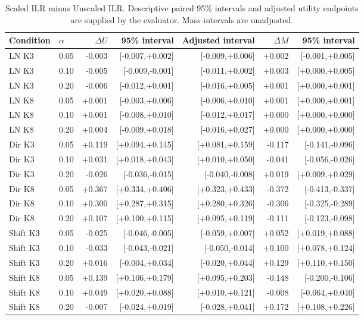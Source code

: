 \begin{table}[p]
\centering\scriptsize
\caption{Scaled ILR minus Unscaled ILR. Descriptive paired 95\% intervals and adjusted utility endpoints are supplied by the evaluator. Mass intervals are unadjusted.}
\begin{tabular}{llrrrrr}
\toprule
Condition & $\alpha$ & $\Delta U$ & 95\% interval & Adjusted interval & $\Delta M$ & 95\% interval \\
\midrule
LN K3 & 0.05 & -0.003 & [-0.007,+0.002] & [-0.009,+0.006] & +0.002 & [-0.001,+0.005] \\
LN K3 & 0.10 & -0.005 & [-0.009,-0.001] & [-0.011,+0.002] & +0.003 & [+0.000,+0.005] \\
LN K3 & 0.20 & -0.006 & [-0.012,+0.001] & [-0.016,+0.005] & +0.001 & [+0.000,+0.001] \\
LN K8 & 0.05 & +0.001 & [-0.003,+0.006] & [-0.006,+0.010] & +0.001 & [+0.000,+0.001] \\
LN K8 & 0.10 & +0.001 & [-0.008,+0.010] & [-0.012,+0.017] & +0.000 & [+0.000,+0.000] \\
LN K8 & 0.20 & +0.004 & [-0.009,+0.018] & [-0.016,+0.027] & +0.000 & [+0.000,+0.000] \\
Dir K3 & 0.05 & +0.119 & [+0.094,+0.145] & [+0.081,+0.159] & -0.117 & [-0.141,-0.096] \\
Dir K3 & 0.10 & +0.031 & [+0.018,+0.043] & [+0.010,+0.050] & -0.041 & [-0.056,-0.026] \\
Dir K3 & 0.20 & -0.026 & [-0.036,-0.015] & [-0.040,-0.008] & +0.019 & [+0.009,+0.029] \\
Dir K8 & 0.05 & +0.367 & [+0.334,+0.406] & [+0.323,+0.433] & -0.372 & [-0.413,-0.337] \\
Dir K8 & 0.10 & +0.300 & [+0.287,+0.315] & [+0.280,+0.326] & -0.306 & [-0.325,-0.289] \\
Dir K8 & 0.20 & +0.107 & [+0.100,+0.115] & [+0.095,+0.119] & -0.111 & [-0.123,-0.098] \\
Shift K3 & 0.05 & -0.025 & [-0.046,-0.005] & [-0.059,+0.007] & +0.052 & [+0.019,+0.088] \\
Shift K3 & 0.10 & -0.033 & [-0.043,-0.021] & [-0.050,-0.014] & +0.100 & [+0.078,+0.124] \\
Shift K3 & 0.20 & +0.016 & [-0.004,+0.034] & [-0.020,+0.044] & +0.129 & [+0.110,+0.150] \\
Shift K8 & 0.05 & +0.139 & [+0.106,+0.179] & [+0.095,+0.203] & -0.148 & [-0.200,-0.106] \\
Shift K8 & 0.10 & +0.049 & [+0.020,+0.088] & [+0.010,+0.121] & -0.008 & [-0.064,+0.040] \\
Shift K8 & 0.20 & -0.007 & [-0.024,+0.019] & [-0.028,+0.041] & +0.172 & [+0.108,+0.226] \\
\bottomrule
\end{tabular}
\end{table}
